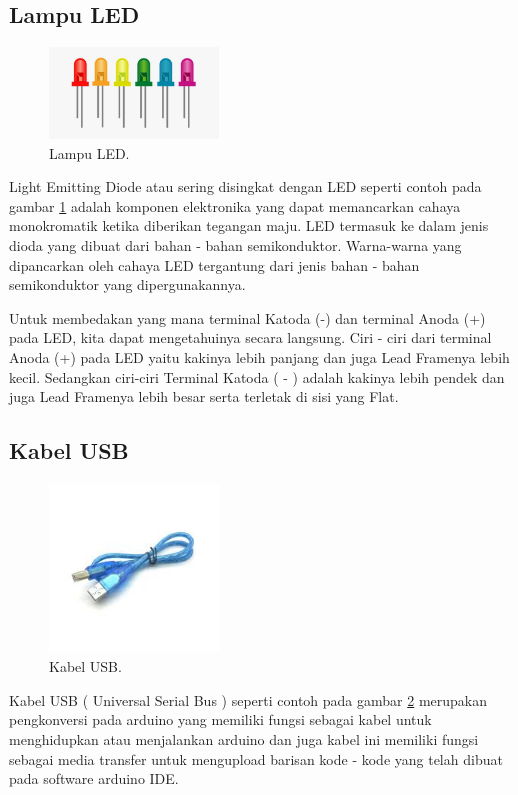 \subsection{Lampu LED}
\begin{figure}[ht]
\centerline{\includegraphics[width=0.4\textwidth]{figures/ledled.jpg}}
\caption{Lampu LED.}
\label{led}
\end{figure}
Light Emitting Diode atau sering disingkat dengan LED seperti contoh pada gambar \ref{led} adalah komponen elektronika yang dapat memancarkan  cahaya monokromatik ketika diberikan tegangan maju. LED termasuk ke dalam jenis dioda yang dibuat dari bahan - bahan semikonduktor. Warna-warna yang dipancarkan oleh cahaya LED tergantung dari jenis bahan - bahan semikonduktor yang dipergunakannya.





Untuk membedakan yang mana terminal Katoda (-) dan terminal Anoda (+) pada LED, kita dapat mengetahuinya secara langsung. Ciri - ciri dari terminal Anoda (+) pada LED yaitu kakinya lebih panjang dan juga Lead Framenya lebih kecil. Sedangkan ciri-ciri Terminal Katoda ( - ) adalah kakinya lebih pendek dan juga Lead Framenya lebih besar serta terletak di sisi yang Flat.
\subsection{Kabel USB}
\begin{figure}[ht]
\centerline{\includegraphics[width=0.4\textwidth]{figures/usb.jpg}}
\caption{Kabel USB.}
\label{usb}
\end{figure}
Kabel USB ( Universal Serial Bus ) seperti contoh pada gambar \ref{usb} merupakan pengkonversi pada arduino yang memiliki fungsi sebagai kabel untuk menghidupkan atau menjalankan arduino dan juga kabel ini memiliki fungsi sebagai media transfer untuk mengupload barisan kode - kode yang telah dibuat pada software arduino IDE.

